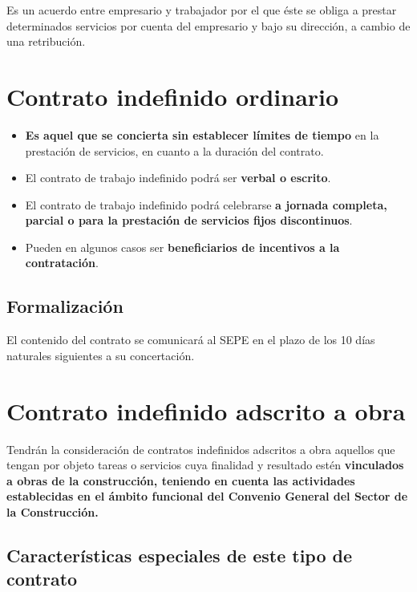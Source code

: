 \documentclass{article}
\begin{document}
	Es un acuerdo entre empresario y trabajador por el que éste se obliga a prestar determinados servicios por cuenta del empresario y bajo su dirección, a cambio de una retribución.
	
	\section*{Contrato indefinido ordinario}
	
	\begin{itemize}
		\item \textbf{Es aquel que se concierta sin establecer límites de tiempo} en la prestación de servicios, en cuanto a la duración del contrato.
		\item El contrato de trabajo indefinido podrá ser \textbf{verbal o escrito}.
		\item El contrato de trabajo indefinido podrá celebrarse \textbf{a jornada completa, parcial o para la prestación de servicios fijos discontinuos}.
		\item Pueden en algunos casos ser \textbf{beneficiarios de incentivos a la contratación}.
	\end{itemize}
	
	\subsection*{Formalización}
	
	El contenido del contrato se comunicará al SEPE en el plazo de los 10 días naturales siguientes a su concertación.
	
	\section*{Contrato indefinido adscrito a obra}
	
	Tendrán la consideración de contratos indefinidos adscritos a obra aquellos que tengan por objeto tareas o servicios cuya finalidad y resultado estén \textbf{vinculados a obras de la construcción, teniendo en cuenta las actividades establecidas en el ámbito funcional del Convenio General del Sector de la Construcción.}
	
	\subsection*{Características especiales de este tipo de contrato}
	
\end{document}
